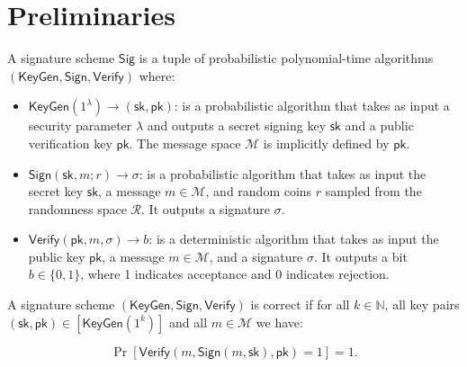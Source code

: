 \newpage
\section{Preliminaries}

\begin{definition}
A signature scheme $\mathsf{Sig}$ is a tuple of probabilistic polynomial-time algorithms $(\mathsf{KeyGen}, \mathsf{Sign}, \mathsf{Verify})$ where:

\begin{itemize}
    \item $\mathsf{KeyGen}(1^\lambda) \rightarrow (\mathsf{sk}, \mathsf{pk})$: is a probabilistic algorithm that takes as input a security parameter $\lambda$ and outputs a secret signing key $\mathsf{sk}$ and a public verification key $\mathsf{pk}$. The message space $\mathcal{M}$ is implicitly defined by $\mathsf{pk}$.
    
    \item $\mathsf{Sign}(\mathsf{sk}, m; r) \rightarrow \sigma$: is a probabilistic algorithm that takes as input the secret key $\mathsf{sk}$, a message $m \in \mathcal{M}$, and random coins $r$ sampled from the randomness space $\mathcal{R}$. It outputs a signature $\sigma$.
    
    \item $\mathsf{Verify}(\mathsf{pk}, m, \sigma) \rightarrow b$: is a deterministic algorithm that takes as input the public key $\mathsf{pk}$, a message $m \in \mathcal{M}$, and a signature $\sigma$. It outputs a bit $b \in \{0,1\}$, where 1 indicates acceptance and 0 indicates rejection.
\end{itemize}

\end{definition}

\begin{definition}[Correctness]
A signature scheme $(\mathsf{KeyGen}, \mathsf{Sign}, \mathsf{Verify})$ is correct if for all $k \in \mathbb{N}$, all key pairs $(\mathsf{sk}, \mathsf{pk}) \in [\mathsf{KeyGen}(1^k)]$ and all $m \in \mathcal{M}$ we have:

$$\Pr[\mathsf{Verify}(m, \mathsf{Sign}(m, \mathsf{sk}), \mathsf{pk}) = 1] = 1.$$
\end{definition}

